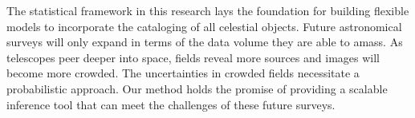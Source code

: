 

The statistical framework in this research lays the foundation for building flexible models to incorporate the cataloging of all celestial objects. 
Future astronomical surveys will only expand in terms of the data volume they are able to amass. 
As telescopes peer deeper into space, fields reveal more sources and images will become more crowded. 
The uncertainties in crowded fields necessitate a probabilistic approach. 
Our method holds the promise of providing  a scalable inference tool that can meet the challenges of these future surveys. 





